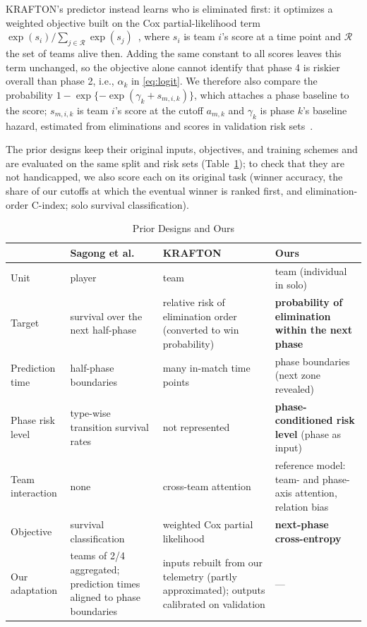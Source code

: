 \documentclass[sigconf,anonymous,nonacm]{acmart}
\begin{document}
KRAFTON's predictor instead learns who is eliminated first: it optimizes a weighted objective built on the Cox partial-likelihood term $\exp(s_i)/\sum_{j\in\mathcal{R}}\exp(s_j)$~\cite{Cox72}, where $s_i$ is team $i$'s score at a time point and $\mathcal{R}$ the set of teams alive then.
Adding the same constant to all scores leaves this term unchanged, so the objective alone cannot identify that phase 4 is riskier overall than phase 2, i.e., $\alpha_k$ in \eqref{eq:logit}.
We therefore also compare the probability $1-\exp\{-\exp(\gamma_k+s_{m,i,k})\}$, which attaches a phase baseline to the score; $s_{m,i,k}$ is team $i$'s score at the cutoff $a_{m,k}$ and $\gamma_k$ is phase $k$'s baseline hazard, estimated from eliminations and scores in validation risk sets~\cite{PrenticeGloeckler78}.

The prior designs keep their original inputs, objectives, and training schemes and are evaluated on the same split and risk sets (Table~\ref{tab:compare}); to check that they are not handicapped, we also score each on its original task (winner accuracy, the share of our cutoffs at which the eventual winner is ranked first, and elimination-order C-index; solo survival classification).

\begin{table}[t]
\centering
\caption{Prior Designs and Ours}
\label{tab:compare}
\footnotesize
\begin{tabular}{p{}p{}p{}p{}}
\hline
 & Sagong et al.~\cite{Sagong25a} & KRAFTON~\cite{KRAFTON} & Ours \\
\hline
Unit & player & team & team (individual in solo) \\
Target & survival over the next half-phase & relative risk of elimination order (converted to win probability) & \textbf{probability of elimination within the next phase} \\
Prediction time & half-phase boundaries & many in-match time points & phase boundaries (next zone revealed) \\
Phase risk level & type-wise transition survival rates & not represented & \textbf{phase-conditioned risk level} (phase as input) \\
Team interaction & none & cross-team attention & reference model: team- and phase-axis attention, relation bias \\
Objective & survival classification & weighted Cox partial likelihood & \textbf{next-phase cross-entropy} \\
\hline
Our adaptation & teams of 2/4 aggregated; prediction times aligned to phase boundaries & inputs rebuilt from our telemetry (partly approximated); outputs calibrated on validation & --- \\
\hline
\end{tabular}
\end{table}
\end{document}
